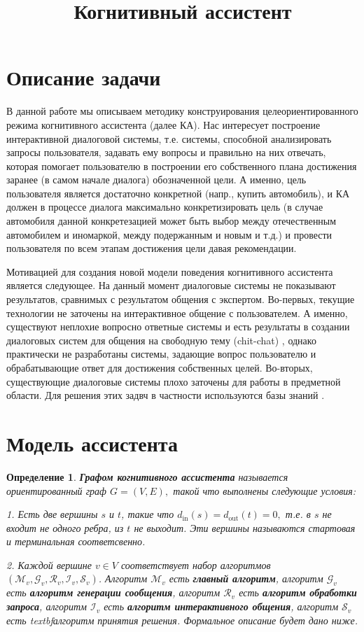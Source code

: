 \documentclass[12pt]{article}
\title{Когнитивный ассистент}
\newtheorem{defin}{Определение}[section]
\begin{document}
\maketitle

\section{Описание задачи}

В данной работе мы описываем методику конструирования целеориентированного режима когнитивного ассистента (далее КА). Нас интересует построение интерактивной диалоговой системы, т.е. системы, способной анализировать запросы пользователя, задавать ему вопросы и правильно на них отвечать, которая помогает пользователю в построении его собственного плана достижения заранее (в самом начале диалога) обозначенной цели. А именно, цель пользователя является достаточно конкретной (напр., купить автомобиль), и КА должен в процессе диалога максимально конкретизировать цель (в случае автомобиля данной конкретезацией может быть выбор между отечественным автомобилем и иномаркой, между подержанным и новым и т.д.) и провести пользователя по всем этапам достижения цели давая рекомендации.

Мотивацией для создания новой модели поведения когнитивного ассистента является следующее. На данный момент диалоговые системы не показывают результатов, сравнимых с результатом общения с экспертом. Во-первых, текущие технологии не заточены на интерактивное общение с пользователем. А именно, существуют неплохие вопросно ответные системы \cite{1} и есть результаты в создании диалоговых систем для общения на свободную тему (chit-chat) \cite{2}, однако практически не разработаны системы, задающие вопрос пользователю и обрабатывающие ответ для достижения собственных целей. Во-вторых, существующие диалоговые системы плохо заточены для работы в предметной области. Для решения этих задвч в частности используются базы знаний \cite{3}.

\section{Модель ассистента}

\begin{defin} {\textbf{Графом когнитивного ассистента} называется ориентированный граф $G=(V,E),$ такой что выполнены следующие условия:

1. Есть две вершины $s$ и $t$, такие что $d_\text{in}(s)=d_\text{out}(t)=0,$ т.е. в $s$ не входит не одного ребра, из  $t$ не выходит. Эти вершины называются стартовая и терминальная соответсвенно.

2. Каждой вершине $v\in V$ соответствует набор алгоритмов $(\mathcal{M}_v, \mathcal{G}_v, \mathcal{R}_v, \mathcal{I}_v, \mathcal{S}_v)$. Алгоритм $\mathcal{M}_v$  есть \textbf{главный алгоритм}, алгоритм $\mathcal{G}_v$  есть \textbf{алгоритм генерации сообщения}, алгоритм $\mathcal{R}_v$  есть \textbf{алгоритм обработки запроса}, алгоритм $\mathcal{I}_v$  есть \textbf{алгоритм интерактивного общения}, алгоритм $\mathcal{S}_v$  есть textbf{алгоритм принятия решения}. Формальное описание будет дано ниже.}\end{defin}
\end{document}
